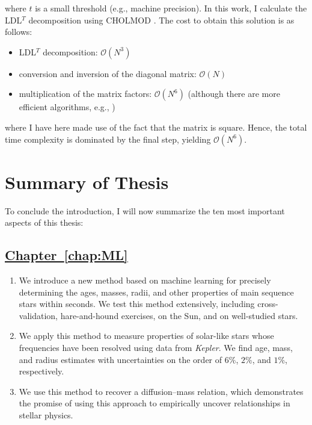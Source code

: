 where $t$ is a small threshold (e.g., machine precision). 
In this work, I calculate the LDL$^T$ decomposition using {\textsc CHOLMOD} \citep{Chen2008Algorithm8C}. 
The cost to obtain this solution is as follows: 
\begin{itemize}
    \item LDL$^T$ decomposition: ${\mathcal{O}(N^3)}$ \citep{6710599}
    \item conversion and inversion of the diagonal matrix: ${\mathcal{O}(N)}$ %
    \item multiplication of the matrix factors: ${\mathcal{O}(N^6)}$ %
    (although there are more efficient algorithms, e.g., \citealt{COPPERSMITH1990251})
\end{itemize}
where I have here made use of the fact that the matrix is square. 
Hence, the total time complexity is dominated by the final step, yielding $\mathcal{O}(N^6)$. 


\newpage
\section{Summary of Thesis}
To conclude the introduction, I will now summarize the ten most important aspects of this thesis: 

\subsection*{\hspace*{0.5cm}\hyperref[chap:ML]{Chapter~\ref{chap:ML}} \citep{2016apj...830...31b}}
\begin{enumerate}
    \item We introduce a new method based on machine learning for precisely determining the ages, masses, radii, and other properties of main sequence stars within seconds. 
    We test this method extensively, including cross-validation, hare-and-hound exercises, on the Sun, and on well-studied stars. 
    \item We apply this method to measure properties of solar-like stars whose frequencies have been resolved using data from \emph{Kepler}. 
    We find age, mass, and radius estimates with uncertainties on the order of $6\%$, $2\%$, and $1\%$, respectively. 
    \item We use this method to recover a diffusion--mass relation, which demonstrates the promise of using this approach to empirically uncover relationships in stellar physics. %
\end{enumerate}

